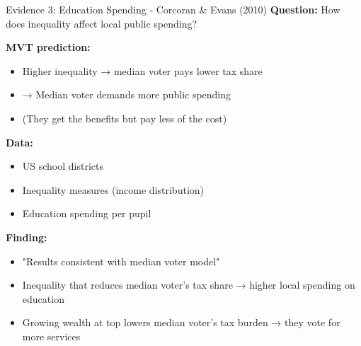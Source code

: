 \documentclass[10pt]{beamer}
\begin{document}
\begin{frame}[allowframebreaks]{Evidence 3: Education Spending - Corcoran \& Evans (2010)}
\textbf{Question:} How does inequality affect local public spending?



\textbf{MVT prediction:}
\begin{itemize}
\item Higher inequality → median voter pays lower tax share
\item → Median voter demands more public spending
\item (They get the benefits but pay less of the cost)
\end{itemize}



\textbf{Data:}
\begin{itemize}
\item US school districts
\item Inequality measures (income distribution)
\item Education spending per pupil
\end{itemize}


  \framebreak  
\textbf{Finding:}
\begin{itemize}
\item \alert{"Results consistent with median voter model"}
\item Inequality that reduces median voter's tax share → higher local spending on education
\item Growing wealth at top lowers median voter's tax burden → they vote for more services
\end{itemize}
\end{frame}
\end{document}
